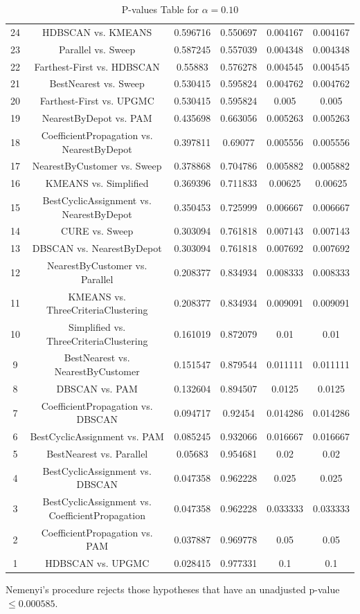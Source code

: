 \documentclass[a4paper,10pt]{article}
\begin{document}
\begin{landscape}
\begin{table}[!htp]
\begin{tabular}{cccccc}
24&HDBSCAN vs. KMEANS&0.596716&0.550697&0.004167&0.004167\\
23&Parallel vs. Sweep&0.587245&0.557039&0.004348&0.004348\\
22&Farthest-First vs. HDBSCAN&0.55883&0.576278&0.004545&0.004545\\
21&BestNearest vs. Sweep&0.530415&0.595824&0.004762&0.004762\\
20&Farthest-First vs. UPGMC&0.530415&0.595824&0.005&0.005\\
19&NearestByDepot vs. PAM&0.435698&0.663056&0.005263&0.005263\\
18&CoefficientPropagation vs. NearestByDepot&0.397811&0.69077&0.005556&0.005556\\
17&NearestByCustomer vs. Sweep&0.378868&0.704786&0.005882&0.005882\\
16&KMEANS vs. Simplified&0.369396&0.711833&0.00625&0.00625\\
15&BestCyclicAssignment vs. NearestByDepot&0.350453&0.725999&0.006667&0.006667\\
14&CURE vs. Sweep&0.303094&0.761818&0.007143&0.007143\\
13&DBSCAN vs. NearestByDepot&0.303094&0.761818&0.007692&0.007692\\
12&NearestByCustomer vs. Parallel&0.208377&0.834934&0.008333&0.008333\\
11&KMEANS vs. ThreeCriteriaClustering&0.208377&0.834934&0.009091&0.009091\\
10&Simplified vs. ThreeCriteriaClustering&0.161019&0.872079&0.01&0.01\\
9&BestNearest vs. NearestByCustomer&0.151547&0.879544&0.011111&0.011111\\
8&DBSCAN vs. PAM&0.132604&0.894507&0.0125&0.0125\\
7&CoefficientPropagation vs. DBSCAN&0.094717&0.92454&0.014286&0.014286\\
6&BestCyclicAssignment vs. PAM&0.085245&0.932066&0.016667&0.016667\\
5&BestNearest vs. Parallel&0.05683&0.954681&0.02&0.02\\
4&BestCyclicAssignment vs. DBSCAN&0.047358&0.962228&0.025&0.025\\
3&BestCyclicAssignment vs. CoefficientPropagation&0.047358&0.962228&0.033333&0.033333\\
2&CoefficientPropagation vs. PAM&0.037887&0.969778&0.05&0.05\\
1&HDBSCAN vs. UPGMC&0.028415&0.977331&0.1&0.1\\
\hline
\end{tabular}
\caption{P-values Table for $\alpha=0.10$}
\end{table}Nemenyi's procedure rejects those hypotheses that have an unadjusted p-value $\le0.000585$.


\end{landscape}
\end{document}
